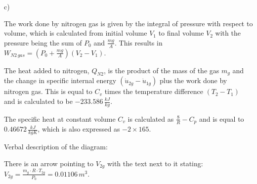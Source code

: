c)

The work done by nitrogen gas is given by the integral of pressure with respect to volume, which is calculated from initial volume \( V_1 \) to final volume \( V_2 \) with the pressure being the sum of \( P_0 \) and \( \frac{mg}{A} \). This results in \( W_{N2 \, gas} = (P_0 + \frac{mg}{A})(V_2 - V_1) \).

The heat added to nitrogen, \( Q_{N2} \), is the product of the mass of the gas \( m_g \) and the change in specific internal energy \( (\dot{u}_{2g} - \dot{u}_{1g}) \) plus the work done by nitrogen gas. This is equal to \( C_v \) times the temperature difference \( (T_2 - T_1) \) and is calculated to be \(-233.586 \, \frac{kJ}{kg}\).

The specific heat at constant volume \( C_v \) is calculated as \( \frac{8}{R} - C_p \) and is equal to \( 0.46672 \, \frac{kJ}{kgK} \), which is also expressed as \(-2 \times 165\).

Verbal description of the diagram:

There is an arrow pointing to \( V_{2g} \) with the text next to it stating:
\( V_{2g} = \frac{m_g \cdot R \cdot T_{2g}}{P_0} = 0.01106 \, m^3 \).